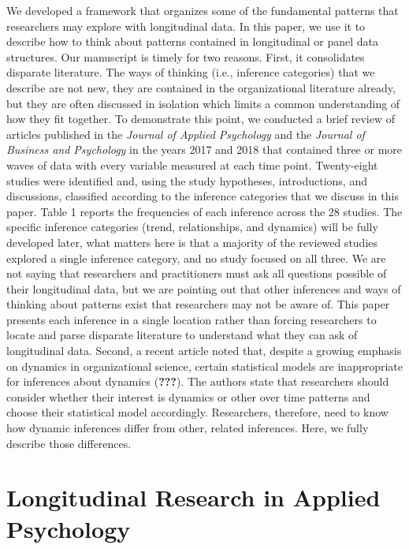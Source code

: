 \documentclass[english,,man]{apa6}
\begin{document}
We developed a framework that organizes some of the fundamental patterns that researchers may explore with longitudinal data. In this paper, we use it to describe how to think about patterns contained in longitudinal or panel data structures. Our manuscript is timely for two reasons. First, it consolidates disparate literature. The ways of thinking (i.e., inference categories) that we describe are not new, they are contained in the organizational literature already, but they are often discussed in isolation which limits a common understanding of how they fit together. To demonstrate this point, we conducted a brief review of articles published in the \emph{Journal of Applied Psychology} and the \emph{Journal of Business and Psychology} in the years 2017 and 2018 that contained three or more waves of data with every variable measured at each time point. Twenty-eight studies were identified and, using the study hypotheses, introductions, and discussions, classified according to the inference categories that we discuss in this paper. Table 1 reports the frequencies of each inference across the 28 studies. The specific inference categories (trend, relationships, and dynamics) will be fully developed later, what matters here is that a majority of the reviewed studies explored a single inference category, and no study focused on all three. We are not saying that researchers and practitioners must ask all questions possible of their longitudinal data, but we are pointing out that other inferences and ways of thinking about patterns exist that researchers may not be aware of. This paper presents each inference in a single location rather than forcing researchers to locate and parse disparate literature to understand what they can ask of longitudinal data. Second, a recent article noted that, despite a growing emphasis on dynamics in organizational science, certain statistical models are inappropriate for inferences about dynamics ({\textbf{???}}). The authors state that researchers should consider whether their interest is dynamics or other over time patterns and choose their statistical model accordingly. Researchers, therefore, need to know how dynamic inferences differ from other, related inferences. Here, we fully describe those differences.

\hypertarget{longitudinal-research-in-applied-psychology}{%
\section{Longitudinal Research in Applied Psychology}\label{longitudinal-research-in-applied-psychology}}
\end{document}
